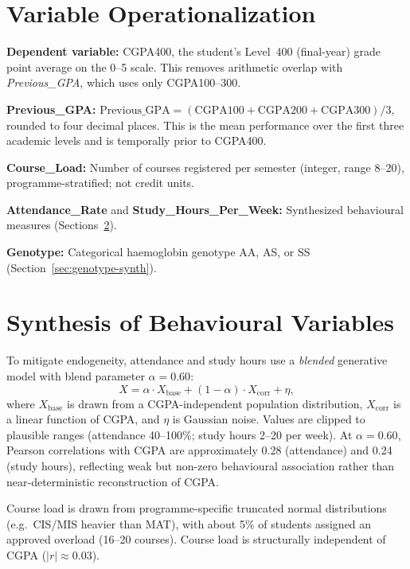 \documentclass[12pt]{report}
\begin{document}
	\section{Variable Operationalization}
	\label{sec:operationalization}
	\textbf{Dependent variable:} CGPA400, the student's Level~400 (final-year) grade point average on the 0--5 scale. This removes arithmetic overlap with \textit{Previous\_GPA}, which uses only CGPA100--300.
	
	\textbf{Previous\_GPA:} $\text{Previous\_GPA} = (\text{CGPA100} + \text{CGPA200} + \text{CGPA300})/3$, rounded to four decimal places. This is the mean performance over the first three academic levels and is temporally prior to CGPA400.
	
	\textbf{Course\_Load:} Number of courses registered per semester (integer, range 8--20), programme-stratified; not credit units.
	
	\textbf{Attendance\_Rate} and \textbf{Study\_Hours\_Per\_Week:} Synthesized behavioural measures (Sections~\ref{sec:synthesis}).
	
	\textbf{Genotype:} Categorical haemoglobin genotype AA, AS, or SS (Section~\ref{sec:genotype-synth}).
	
	\section{Synthesis of Behavioural Variables}
	\label{sec:synthesis}
	To mitigate endogeneity, attendance and study hours use a \textit{blended} generative model with blend parameter $\alpha = 0.60$:
	\begin{equation}
		X = \alpha \cdot X_{\text{base}} + (1 - \alpha) \cdot X_{\text{corr}} + \eta,
	\end{equation}
	where $X_{\text{base}}$ is drawn from a CGPA-independent population distribution, $X_{\text{corr}}$ is a linear function of CGPA, and $\eta$ is Gaussian noise. Values are clipped to plausible ranges (attendance 40--100\%; study hours 2--20 per week). At $\alpha = 0.60$, Pearson correlations with CGPA are approximately 0.28 (attendance) and 0.24 (study hours), reflecting weak but non-zero behavioural association rather than near-deterministic reconstruction of CGPA.
	
	Course load is drawn from programme-specific truncated normal distributions (e.g.\ CIS/MIS heavier than MAT), with about 5\% of students assigned an approved overload (16--20 courses). Course load is structurally independent of CGPA ($|r| \approx 0.03$).
	
\end{document}
